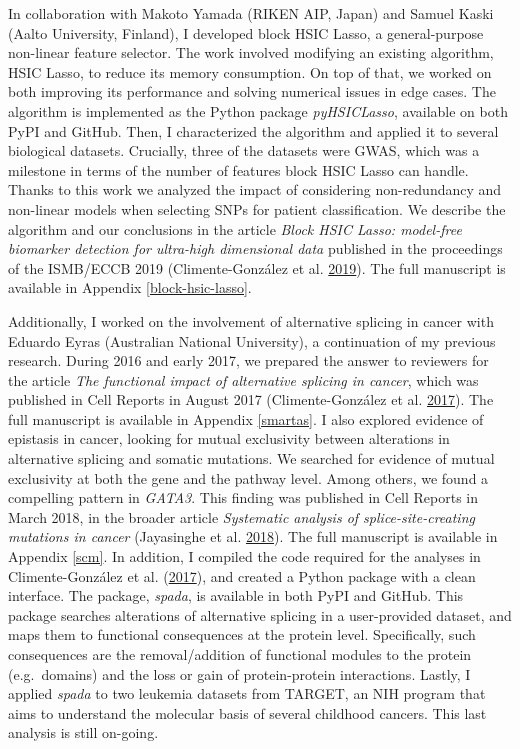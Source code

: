 \documentclass[
  11pt,
]{env/yjiao}
\begin{document}
In collaboration with Makoto Yamada (RIKEN AIP, Japan) and Samuel Kaski (Aalto University, Finland), I developed block HSIC Lasso, a general-purpose non-linear feature selector. The work involved modifying an existing algorithm, HSIC Lasso, to reduce its memory consumption. On top of that, we worked on both improving its performance and solving numerical issues in edge cases. The algorithm is implemented as the Python package \emph{pyHSICLasso}, available on both PyPI and GitHub. Then, I characterized the algorithm and applied it to several biological datasets. Crucially, three of the datasets were GWAS, which was a milestone in terms of the number of features block HSIC Lasso can handle. Thanks to this work we analyzed the impact of considering non-redundancy and non-linear models when selecting SNPs for patient classification. We describe the algorithm and our conclusions in the article \emph{Block HSIC Lasso: model-free biomarker detection for ultra-high dimensional data} published in the proceedings of the ISMB/ECCB 2019 (Climente-González et al. \protect\hyperlink{ref-climente-gonzalez_block_2019}{2019}). The full manuscript is available in Appendix \ref{block-hsic-lasso}.

Additionally, I worked on the involvement of alternative splicing in cancer with Eduardo Eyras (Australian National University), a continuation of my previous research. During 2016 and early 2017, we prepared the answer to reviewers for the article \emph{The functional impact of alternative splicing in cancer}, which was published in Cell Reports in August 2017 (Climente-González et al. \protect\hyperlink{ref-climente-gonzalez_functional_2017}{2017}). The full manuscript is available in Appendix \ref{smartas}. I also explored evidence of epistasis in cancer, looking for mutual exclusivity between alterations in alternative splicing and somatic mutations. We searched for evidence of mutual exclusivity at both the gene and the pathway level. Among others, we found a compelling pattern in \emph{GATA3}. This finding was published in Cell Reports in March 2018, in the broader article \emph{Systematic analysis of splice-site-creating mutations in cancer} (Jayasinghe et al. \protect\hyperlink{ref-jayasinghe_systematic_2018}{2018}). The full manuscript is available in Appendix \ref{scm}. In addition, I compiled the code required for the analyses in Climente-González et al. (\protect\hyperlink{ref-climente-gonzalez_functional_2017}{2017}), and created a Python package with a clean interface. The package, \emph{spada}, is available in both PyPI and GitHub. This package searches alterations of alternative splicing in a user-provided dataset, and maps them to functional consequences at the protein level. Specifically, such consequences are the removal/addition of functional modules to the protein (e.g.~domains) and the loss or gain of protein-protein interactions. Lastly, I applied \emph{spada} to two leukemia datasets from TARGET, an NIH program that aims to understand the molecular basis of several childhood cancers. This last analysis is still on-going.
\end{document}
